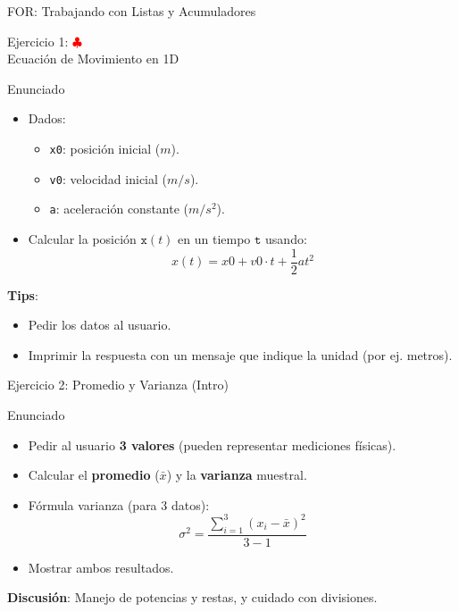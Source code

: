 \documentclass[10pt]{beamer}
\begin{document}
\begin{frame}[fragile]{FOR: Trabajando con Listas y Acumuladores}
\begin{frame}{Ejercicio 1: \hfill \textcolor{red}{$\clubsuit$} \\ Ecuación de Movimiento en 1D}
  \begin{block}{Enunciado}
    \begin{itemize}
      \item Dados:
        \begin{itemize}
          \item \texttt{x0}: posición inicial (\(m\)).
          \item \texttt{v0}: velocidad inicial (\(m/s\)).
          \item \texttt{a}: aceleración constante (\(m/s^2\)).
        \end{itemize}
      \item Calcular la posición \(\texttt{x}(t)\) en un tiempo \(\texttt{t}\) usando:
        \[
          x(t) = x0 + v0\cdot t + \frac{1}{2} a t^2
        \]
    \end{itemize}
  \end{block}
  \textbf{Tips}:
  \begin{itemize}
    \item Pedir los datos al usuario.
    \item Imprimir la respuesta con un mensaje que indique la unidad (por ej. metros).
  \end{itemize}
\end{frame}

\begin{frame}{Ejercicio 2: Promedio y Varianza (Intro)}
  \begin{block}{Enunciado}
    \begin{itemize}
      \item Pedir al usuario \textbf{3 valores} (pueden representar mediciones físicas).
      \item Calcular el \textbf{promedio} (\(\bar{x}\)) y la \textbf{varianza} muestral.
      \item Fórmula varianza (para 3 datos):
      \[
        \sigma^2 = \frac{\sum_{i=1}^{3}(x_i - \bar{x})^2}{3 - 1}
      \]
      \item Mostrar ambos resultados.
    \end{itemize}
  \end{block}
  \textbf{Discusión}: Manejo de potencias y restas, y cuidado con divisiones.
\end{frame}


\end{frame}
\end{document}
